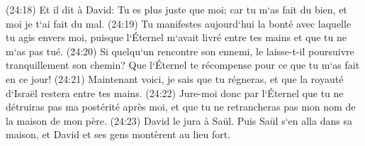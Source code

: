 \verse (24:18) Et il dit à David: Tu es plus juste que moi; car tu m`as fait du bien, et moi je t`ai fait du mal. 
\verse (24:19) Tu manifestes aujourd`hui la bonté avec laquelle tu agis envers moi, puisque l`Éternel m`avait livré entre tes mains et que tu ne m`as pas tué. 
\verse (24:20) Si quelqu`un rencontre son ennemi, le laisse-t-il poursuivre tranquillement son chemin? Que l`Éternel te récompense pour ce que tu m`as fait en ce jour! 
\verse (24:21) Maintenant voici, je sais que tu régneras, et que la royauté d`Israël restera entre tes mains. 
\verse (24:22) Jure-moi donc par l`Éternel que tu ne détruiras pas ma postérité après moi, et que tu ne retrancheras pas mon nom de la maison de mon père. 
\verse (24:23) David le jura à Saül. Puis Saül s`en alla dans sa maison, et David et ses gens montèrent au lieu fort. 

\chapter{}

